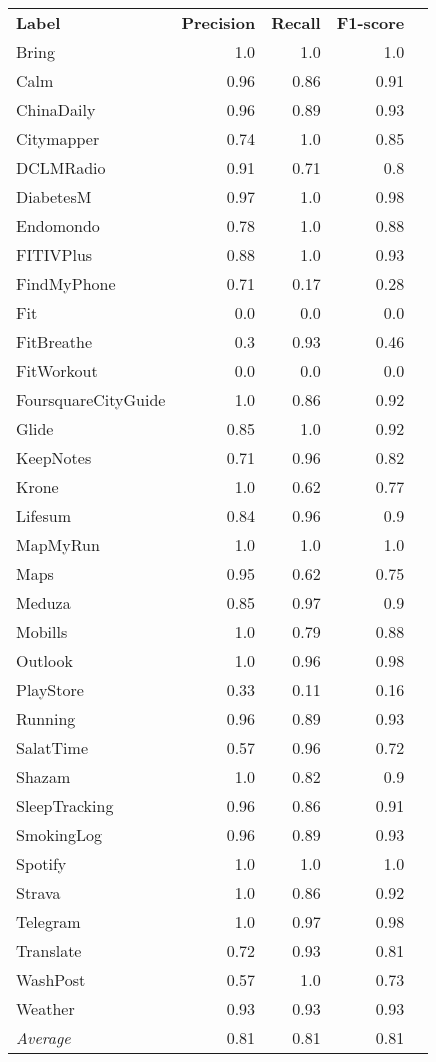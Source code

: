 \begin{tabular}{lrrrr}
    \textbf{Label} & \textbf{Precision} & \textbf{Recall} & \textbf{F1-score} \\
    Bring & 1.0 & 1.0 & 1.0 \\
    Calm & 0.96 & 0.86 & 0.91 \\
    ChinaDaily & 0.96 & 0.89 & 0.93 \\
    Citymapper & 0.74 & 1.0 & 0.85 \\
    DCLMRadio & 0.91 & 0.71 & 0.8 \\
    DiabetesM & 0.97 & 1.0 & 0.98 \\
    Endomondo & 0.78 & 1.0 & 0.88 \\
    FITIVPlus & 0.88 & 1.0 & 0.93 \\
    FindMyPhone & 0.71 & 0.17 & 0.28 \\
    Fit & 0.0 & 0.0 & 0.0 \\
    FitBreathe & 0.3 & 0.93 & 0.46 \\
    FitWorkout & 0.0 & 0.0 & 0.0 \\
    FoursquareCityGuide & 1.0 & 0.86 & 0.92 \\
    Glide & 0.85 & 1.0 & 0.92 \\
    KeepNotes & 0.71 & 0.96 & 0.82 \\
    Krone & 1.0 & 0.62 & 0.77 \\
    Lifesum & 0.84 & 0.96 & 0.9 \\
    MapMyRun & 1.0 & 1.0 & 1.0 \\
    Maps & 0.95 & 0.62 & 0.75 \\
    Meduza & 0.85 & 0.97 & 0.9 \\
    Mobills & 1.0 & 0.79 & 0.88 \\
    Outlook & 1.0 & 0.96 & 0.98 \\
    PlayStore & 0.33 & 0.11 & 0.16 \\
    Running & 0.96 & 0.89 & 0.93 \\
    SalatTime & 0.57 & 0.96 & 0.72 \\
    Shazam & 1.0 & 0.82 & 0.9 \\
    SleepTracking & 0.96 & 0.86 & 0.91 \\
    SmokingLog & 0.96 & 0.89 & 0.93 \\
    Spotify & 1.0 & 1.0 & 1.0 \\
    Strava & 1.0 & 0.86 & 0.92 \\
    Telegram & 1.0 & 0.97 & 0.98 \\
    Translate & 0.72 & 0.93 & 0.81 \\
    WashPost & 0.57 & 1.0 & 0.73 \\
    Weather & 0.93 & 0.93 & 0.93 \\
    \emph{Average} & 0.81 & 0.81 & 0.81 \\
\end{tabular}